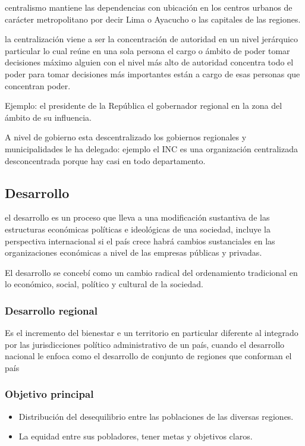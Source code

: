 \documentclass[
  jou,
  floatsintext,
  longtable,
  a4paper,
  nolmodern,
  notxfonts,
  notimes,
  12pt,
  colorlinks=true,linkcolor=blue,citecolor=blue,urlcolor=blue]{apa7}
\providecommand{\tightlist}{%
  \setlength{\itemsep}{0pt}\setlength{\parskip}{0pt}}
\begin{document}
centralismo mantiene las dependencias con ubicación en los centros
urbanos de carácter metropolitano por decir Lima o Ayacucho o las
capitales de las regiones.

la centralización viene a ser la concentración de autoridad en un nivel
jerárquico particular lo cual reúne en una sola persona el cargo o
ámbito de poder tomar decisiones máximo alguien con el nivel más alto de
autoridad concentra todo el poder para tomar decisiones más importantes
están a cargo de esas personas que concentran poder.

Ejemplo: el presidente de la República el gobernador regional en la zona
del ámbito de su influencia.

A nivel de gobierno esta descentralizado los gobiernos regionales y
municipalidades le ha delegado: ejemplo el INC es una organización
centralizada desconcentrada porque hay casi en todo departamento.

\subsection{Desarrollo}\label{desarrollo}

el desarrollo es un proceso que lleva a una modificación sustantiva de
las estructuras económicas políticas e ideológicas de una sociedad,
incluye la perspectiva internacional si el país crece habrá cambios
sustanciales en las organizaciones económicas a nivel de las empresas
públicas y privadas.

El desarrollo se concebí como un cambio radical del ordenamiento
tradicional en lo económico, social, político y cultural de la sociedad.

\subsubsection{Desarrollo regional}\label{desarrollo-regional}

Es el incremento del bienestar e un territorio en particular diferente
al integrado por las jurisdicciones político administrativo de un país,
cuando el desarrollo nacional le enfoca como el desarrollo de conjunto
de regiones que conforman el país

\subsubsection{Objetivo principal}\label{objetivo-principal}

\begin{itemize}
\tightlist
\item
  Distribución del desequilibrio entre las poblaciones de las diversas
  regiones.
\item
  La equidad entre sus pobladores, tener metas y objetivos claros.
\end{itemize}
\end{document}
